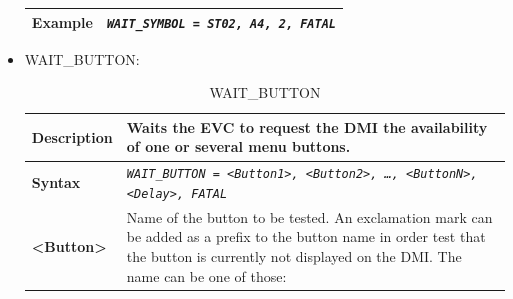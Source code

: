 \documentclass{template/openetcs}
\begin{document}
\begin{itemize}
\begin{longtable}{|l|l|}
				\hline
															
					\begin{minipage}[t]{0.22\linewidth} \textbf{Example} \end{minipage}
				&	\begin{minipage}[t]{0.78\linewidth} \emph{\texttt{WAIT\_SYMBOL = ST02, A4, 2, FATAL}} \end{minipage} \\
				
				\hline \hline
				
			\end{longtable}
			
		\item WAIT\_BUTTON:
		
			\begin{longtable}{|l|l|}
				\caption{WAIT\_BUTTON}\\ 
				\hline
				
					\begin{minipage}[t]{0.22\linewidth} \textbf{Description} \end{minipage} 
				&	\begin{minipage}[t]{0.78\linewidth} Waits the EVC to request the DMI the availability of one or several menu buttons. \end{minipage} \\
				
				\hline
								
					\begin{minipage}[t]{0.22\linewidth} \textbf{Syntax}	\end{minipage}
				&	\begin{minipage}[t]{0.78\linewidth} \emph{\texttt{WAIT\_BUTTON = <Button1>, <Button2>, …, <ButtonN>, <Delay>, FATAL}} \end{minipage} \\
				
				\hline
				
					\multirow{1}{*}{ \begin{minipage}[t]{0.22\linewidth} \textbf{<Button>}	\end{minipage} }
				&	\begin{minipage}[t]{0.78\linewidth} Name of the button to be tested. An exclamation mark can be added as a prefix to the button name in order test that the button is currently not displayed on the DMI. The name can be one of those:\end{minipage} \\
				
				\hline
					

\end{longtable}
\end{itemize}
\end{document}
